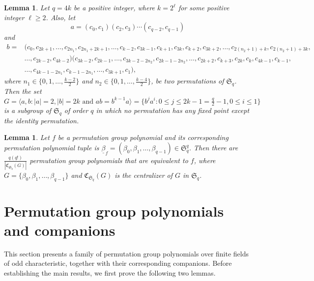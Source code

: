 \documentclass[11pt]{amsart}
\theoremstyle{plain}
\newtheorem{lem}[thm]{Lemma}
\numberwithin{equation}{section}
\begin{document}
\begin{lem}\label{HK3}{\upshape \cite[Theorem 3.13]{HK}}
Let $q=4k$ be a positive integer, where $k=2^{\ell}$ for some positive integer $\ell \geq 2$. Also, let 
\[
a=(c_0,c_1)(c_2,c_3)\cdots(c_{q-2},c_{q-1})
\]
and
\begin{equation*}
    \begin{split}
        b=& (c_0, c_{2k+1}, \ldots, c_{2n_1}, c_{2n_1+2k+1}, \ldots , c_{k-2}, c_{3k-1}, c_{k+1},c_{3k},c_{k+2},c_{3k+2}, \ldots, c_{2(n_2+1)+k},c_{2(n_2+1)+3k},\\
        & \ldots, c_{2k-2}, c_{4k-2}) (c_{3k-2},c_{2k-1}, \ldots, c_{3k-2-2n_2}, c_{2k-1-2n_2}, \ldots ,c_{2k+2},c_{k+3}, c_{2k},c_{k}, c_{4k-1}, c_{k-1}, \\
        & \ldots, c_{4k-1-2n_1},c_{k-1-2n_1}, \ldots, c_{3k+1},c_{1}), 
    \end{split}
\end{equation*}
where $n_1 \in \{0,1,\ldots,\frac{k-2}{2}\}$ and $n_2 \in \{0,1,\ldots,\frac{k-4}{2}\}$, be two permutations of ${\mathfrak S}_q$.
Then the set $G=\langle a,b : |a|=2, |b|=2k \text{ and } ab=b^{k-1}a\rangle =\{b^{j}a^{i}: 0 \leq j \leq 2k-1=\frac{q}{2}-1, 0\leq i \leq 1\}$ is a subgroup of ${\mathfrak S}_q$ of order $q$ in which no permutation has any fixed point except the identity permutation.
\end{lem}
\begin{lem}{\upshape \cite[Theorem 4.5]{HKK}}\label{Equivalent_PGP}
Let $f$ be a permutation group polynomial and its corresponding permutation polynomial tuple is $\underline{\beta}_f=(\beta_0,\beta_1,\ldots,\beta_{q-1})\in \mathfrak{S}_q^{q}$. Then there are $\frac{q(q!)}{|\mathfrak{C}_{\mathfrak{S}_q}(G)|}$ permutation group polynomials that are equivalent to $f$, where $G=\{\beta_0,\beta_1,\ldots,\beta_{q-1}\}$ and $\mathfrak{C}_{\mathfrak{S}_q}(G)$ is the centralizer of $G$ in $\mathfrak{S}_q$.
\end{lem}



 \section{Permutation group polynomials and companions}\label{S3}
This section presents a family of permutation group polynomials over finite fields of odd characteristic, together with their corresponding companions. Before establishing the main results, we first prove the following two lemmas.
 
\end{document}
